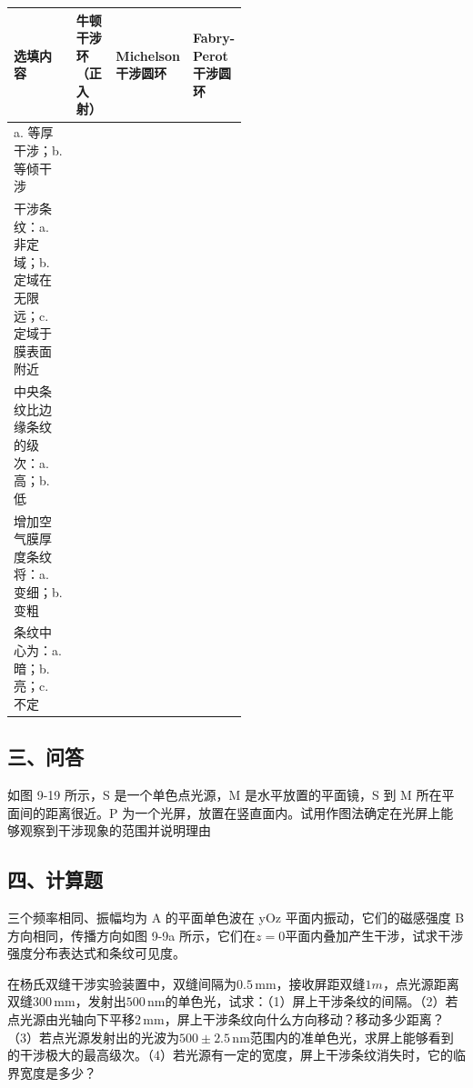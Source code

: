 \documentclass[standard, analysis, notocnum]{ExBook}
\newcommand{\answerarea}[1][8cm]{%
  \par\vspace{2mm}%
  \noindent{\color{themeColor!35}\rule{\linewidth}{0.4pt}}\par
  \noindent\begin{minipage}[t][#1][t]{\linewidth}\vspace{0pt}\end{minipage}\par
  \noindent{\color{themeColor!35}\rule{\linewidth}{0.4pt}}\par
}
\begin{document}
\begin{qitems}
\begin{bbox}
\par\vspace{2mm}
\noindent\begin{tabularx}{\linewidth}{|>{\raggedright\arraybackslash}X|>{\centering\arraybackslash}p{0.17\linewidth}|>{\centering\arraybackslash}p{0.17\linewidth}|>{\centering\arraybackslash}p{0.17\linewidth}|}
\hline
选填内容 & 牛顿干涉环（正入射） & Michelson 干涉圆环 & Fabry-Perot 干涉圆环 \\
\hline
a. 等厚干涉；b. 等倾干涉 & & & \\
\hline
干涉条纹：a. 非定域；b. 定域在无限远；c. 定域于膜表面附近 & & & \\
\hline
中央条纹比边缘条纹的级次：a. 高；b. 低 & & & \\
\hline
增加空气膜厚度条纹将：a. 变细；b. 变粗 & & & \\
\hline
条纹中心为：a. 暗；b. 亮；c. 不定 & & & \\
\hline
\end{tabularx}

\answerarea[3.5cm]
\end{bbox}
\end{qitems}

\subsection{三、问答}
\begin{qitems}[unshow,suffix={}]
\qitem 如图 9-19 所示，S 是一个单色点光源，M 是水平放置的平面镜，S 到 M 所在平面间的距离很近。P 为一个光屏，放置在竖直面内。试用作图法确定在光屏上能够观察到干涉现象的范围并说明理由
\label{q:205:start}
\answerarea[8cm]
\label{q:205:end}
\end{qitems}

\subsection{四、计算题}
\begin{qitems}[startnum=1]
\qitem 三个频率相同、振幅均为 A 的平面单色波在 yOz 平面内振动，它们的磁感强度 B 方向相同，传播方向如图 9-9a 所示，它们在$z=0$平面内叠加产生干涉，试求干涉强度分布表达式和条纹可见度。
\label{q:207:start}
\answerarea[8cm]
\label{q:207:end}
\end{qitems}

\begin{qitems}[startnum=2]
\qitem 在杨氏双缝干涉实验装置中，双缝间隔为$0.5\,\mathrm{mm}$，接收屏距双缝$1m$，点光源距离双缝$300\,\mathrm{mm}$，发射出$500\,\mathrm{nm}$的单色光，试求：（1）屏上干涉条纹的间隔。（2）若点光源由光轴向下平移$2\,\mathrm{mm}$，屏上干涉条纹向什么方向移动？移动多少距离？（3）若点光源发射出的光波为$500\pm 2.5\,\mathrm{nm}$范围内的准单色光，求屏上能够看到的干涉极大的最高级次。（4）若光源有一定的宽度，屏上干涉条纹消失时，它的临界宽度是多少？
\label{q:208:start}
\answerarea[8cm]
\label{q:208:end}
\end{qitems}
\end{document}
